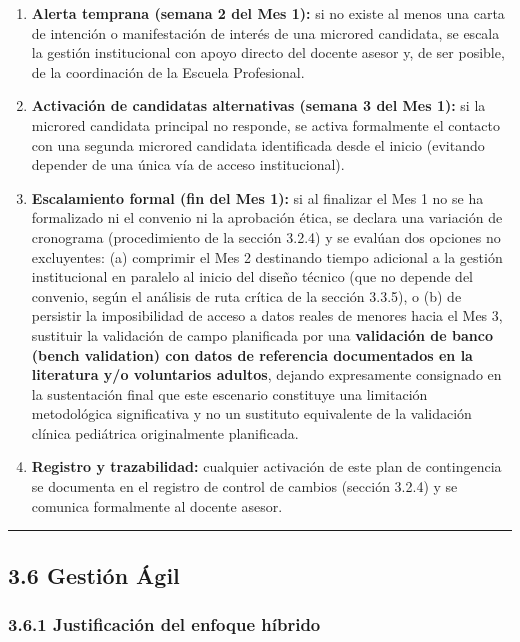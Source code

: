 \documentclass[11pt,a4paper]{article}
\providecommand{\tightlist}{%
  \setlength{\itemsep}{0pt}\setlength{\parskip}{0pt}}
\begin{document}
\begin{enumerate}
\def\labelenumi{\arabic{enumi}.}
\tightlist
\item
  \textbf{Alerta temprana (semana 2 del Mes 1):} si no existe al menos una carta de intención o manifestación de interés de una microred candidata, se escala la gestión institucional con apoyo directo del docente asesor y, de ser posible, de la coordinación de la Escuela Profesional.
\item
  \textbf{Activación de candidatas alternativas (semana 3 del Mes 1):} si la microred candidata principal no responde, se activa formalmente el contacto con una segunda microred candidata identificada desde el inicio (evitando depender de una única vía de acceso institucional).
\item
  \textbf{Escalamiento formal (fin del Mes 1):} si al finalizar el Mes 1 no se ha formalizado ni el convenio ni la aprobación ética, se declara una variación de cronograma (procedimiento de la sección 3.2.4) y se evalúan dos opciones no excluyentes: (a) comprimir el Mes 2 destinando tiempo adicional a la gestión institucional en paralelo al inicio del diseño técnico (que no depende del convenio, según el análisis de ruta crítica de la sección 3.3.5), o (b) de persistir la imposibilidad de acceso a datos reales de menores hacia el Mes 3, sustituir la validación de campo planificada por una \textbf{validación de banco (bench validation) con datos de referencia documentados en la literatura y/o voluntarios adultos}, dejando expresamente consignado en la sustentación final que este escenario constituye una limitación metodológica significativa y no un sustituto equivalente de la validación clínica pediátrica originalmente planificada.
\item
  \textbf{Registro y trazabilidad:} cualquier activación de este plan de contingencia se documenta en el registro de control de cambios (sección 3.2.4) y se comunica formalmente al docente asesor.
\end{enumerate}

\begin{center}\rule{0.5\linewidth}{0.5pt}\end{center}

\subsection{3.6 Gestión Ágil}\label{gestiuxf3n-uxe1gil}

\subsubsection{3.6.1 Justificación del enfoque híbrido}\label{justificaciuxf3n-del-enfoque-huxedbrido}
\end{document}
